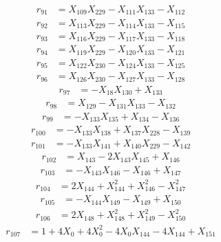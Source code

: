 \begin{align*}
r_{91}&=X_{109}X_{229}-X_{111}X_{133}-X_{112}
\end{align*}
\begin{align*}
r_{92}&=X_{113}X_{229}-X_{114}X_{133}-X_{115}
\end{align*}
\begin{align*}
r_{93}&=X_{116}X_{229}-X_{117}X_{133}-X_{118}
\end{align*}
\begin{align*}
r_{94}&=X_{119}X_{229}-X_{120}X_{133}-X_{121}
\end{align*}
\begin{align*}
r_{95}&=X_{122}X_{230}-X_{124}X_{133}-X_{125}
\end{align*}
\begin{align*}
r_{96}&=X_{126}X_{230}-X_{127}X_{133}-X_{128}
\end{align*}
\begin{align*}
r_{97}&=-X_{18}X_{130}+X_{133}
\end{align*}
\begin{align*}
r_{98}&=X_{129}-X_{131}X_{133}-X_{132}
\end{align*}
\begin{align*}
r_{99}&=-X_{133}X_{135}+X_{134}-X_{136}
\end{align*}
\begin{align*}
r_{100}&=-X_{133}X_{138}+X_{137}X_{228}-X_{139}
\end{align*}
\begin{align*}
r_{101}&=-X_{133}X_{141}+X_{140}X_{229}-X_{142}
\end{align*}
\begin{align*}
r_{102}&=X_{143}-2X_{143}X_{145}+X_{146}
\end{align*}
\begin{align*}
r_{103}&=-X_{143}X_{146}-X_{146}+X_{147}
\end{align*}
\begin{align*}
r_{104}&=2X_{144}+X_{144}^{2}+X_{146}^{2}-X_{147}^{2}
\end{align*}
\begin{align*}
r_{105}&=-X_{144}X_{149}-X_{149}+X_{150}
\end{align*}
\begin{align*}
r_{106}&=2X_{148}+X_{148}^{2}+X_{149}^{2}-X_{150}^{2}
\end{align*}
\begin{align*}
r_{107}&=1+4X_{0}+4X_{0}^{2}-4X_{0}X_{144}-4X_{144}+X_{151}
\end{align*}
